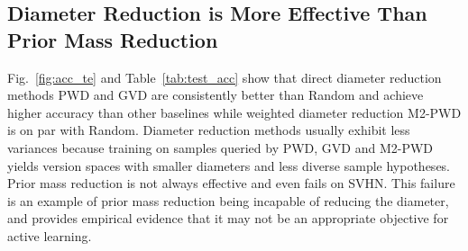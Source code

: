 \documentclass[runningheads, envcountsame, a4paper]{llncs}
\begin{document}
\begin{table}[b!]
\caption{Diameter (pairwise disagreement)  on the test set in percentage.}
\begin{center}
\end{center}
\label{tab:diam_reduc_te}
\end{table}


\subsection{Diameter Reduction is More Effective Than Prior Mass Reduction}
\label{sec:diameter_reduction_is_more_effective_than_prior_mass_reduction}
Fig.~\ref{fig:acc_te} and Table~\ref{tab:test_acc} show that direct diameter reduction methods PWD and GVD are consistently better than Random and achieve higher accuracy than other baselines while weighted diameter reduction M2-PWD is on par with Random. Diameter reduction methods usually exhibit less variances because training on samples queried by PWD, GVD and M2-PWD yields version spaces with smaller diameters and less diverse sample hypotheses. Prior mass reduction is not always effective and even fails on SVHN. This failure is an example of prior mass reduction being incapable of reducing the diameter, and provides empirical evidence that it may not be an appropriate objective for active learning. 
\end{document}
